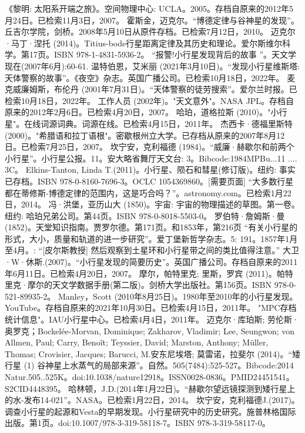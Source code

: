 \begin{enumerate}
 《黎明: 太阳系开端之旅》。空间物理中心: UCLA。2005。存档自原来的2012年5月24日。已检索11月3日，2007。
 霍斯金，迈克尔。“博德定律与谷神星的发现”。丘吉尔学院，剑桥。2008年5月10日从原件存档。已检索7月12日，2010。
 迈克尔·马丁·涅托 (2014)。Titius-bode行星距离定律及其历史和理论。爱尔斯维尔科学。第17页。ISBN 978-1-4831-5936-2。
 “报警!小行星发现背后的故事 ”。天文学现在(2007年6月):60-61.
 温特伯恩，艾米丽 (2021年3月10日)。“发现小行星维斯塔: 天体警察的故事”。《夜空》杂志。英国广播公司。已检索10月18日，2022年。
 麦克威廉姆斯，布伦丹 (2001年7月31日)。“天体警察的徒劳搜索”。爱尔兰时报。已检索10月18日，2022年。
 工作人员 (2002年)。"天文意外"。NASA JPL。存档自原来的2012年2月6日。已检索4月20日，2007。
 哈珀，道格拉斯 (2010)。"小行星"。在线词源词典。词源在线。已检索4月15日，2011年。
 杰西卡·德福里斯特 (2000)。"希腊语和拉丁语根"。密歇根州立大学。已存档从原来的2007年8月12日。已检索7月25日，2007。
 坎宁安，克利福德 (1984)。“威廉·赫歇尔和前两个小行星”。小行星公报。11。安大略省舞厅天文台: 3。Bibcode:1984MPBu...11 .... 3C。
 Elkins-Tanton, Linda T.(2011)。小行星、陨石和彗星(修订版)。纽约: 事实已存档。ISBN 978-0-8160-7696-3。OCLC 1054369860。[需要页面]
 “大多数行星都在蒂修斯-博德定律的范围内，这是巧合吗？”。astronomy.com。已检索1月22日，2014。
 冯·洪堡，亚历山大 (1850)。宇宙: 宇宙的物理描述的草图。第一卷。纽约: 哈珀兄弟公司。第44页。ISBN 978-0-8018-5503-0。
 罗伯特·詹姆斯·曼 (1852)。天堂知识指南。贾罗尔德。第171页。和1853年，第216页
 “有关小行星的形式，大小，质量和轨道的进一步研究”。爱丁堡新哲学杂志。5: 191。1857年1月至4月。: “[皮尔斯教授] 然后观察到土星环和小行星带之间的类比值得注意。”
 大卫·W·休斯.(2007)。“小行星发现的简要历史”。英国广播公司。存档自原来的2011年6月11日。已检索4月20日，2007。
 摩尔，帕特里克; 里斯，罗宾 (2011)。帕特里克·摩尔的天文学数据手册(第二版)。剑桥大学出版社。第156页。ISBN 978-0-521-89935-2。
 Manley，Scott (2010年8月25日)。1980年至2010年的小行星发现。YouTube。存档自原来的2021年10月30日。已检索4月15日，2011年。
 "MPC存档统计信息"。IAU小行星中心。已检索4月4日，2011年。
 迈克尔·库珀斯; 劳伦斯·奥罗克；Bockelée-Morvan, Dominique; Zakharov, Vladimir; Lee, Seungwon; von Allmen, Paul; Carry, Benoît; Teyssier, David; Marston, Anthony; Müller, Thomas; Crovisier, Jacques; Barucci, M.安东尼埃塔; 莫雷诺，拉斐尔 (2014)。“矮行星 (1) 谷神星上水蒸气的局部来源”。自然。505(7484):525-527。Bibcode:2014 Natur.505..525K。doi:10.1038/nature12918。ISSN0028-0836。PMID24451541。S2CID4448395。   
 哈林顿，J.D.(2014年1月22日)。“赫歇尔望远镜探测到矮行星上的水-发布14-021”。NASA。已检索1月22日，2014。
 坎宁安，克利福德J.(2017)。调查小行星的起源和Vesta的早期发现。小行星研究中的历史研究。施普林格国际出版。第1页。doi:10.1007/978-3-319-58118-7。ISBN 978-3-319-58117-0。

\end{enumerate}
